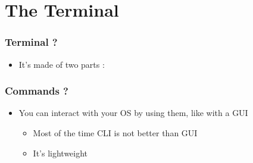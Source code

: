 \section{The Terminal}
\begin{frame}
        \frametitle{Terminal ?}
	\begin{itemize}
	    \item It's made of two parts :
	\end{itemize}
\end{frame}
\begin{frame}
    \frametitle{Commands ?}
    \begin{itemize}
        \item You can interact with your OS by using them, like with a GUI
            \begin{itemize}
                \item Most of the time CLI is not better than GUI
                \item It's lightweight
            \end{itemize}
    \end{itemize}
\end{frame}
